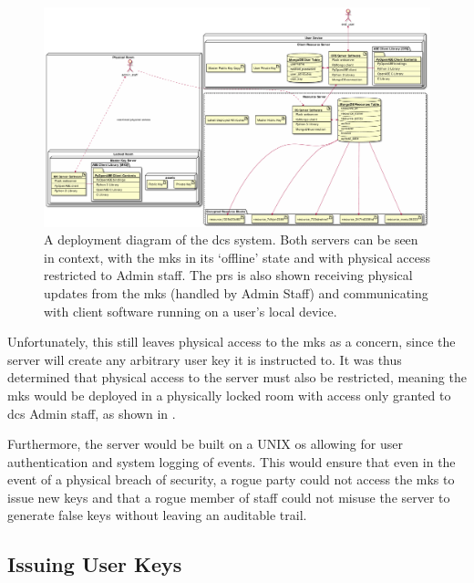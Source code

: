 \begin{figure}[htp]
    \includegraphics[width=\linewidth,keepaspectratio]{images/infrastructure/deployment.pdf}

    \caption{A deployment diagram of the \acrshort{dcs} \theResServer system. Both servers can be seen in context, with the \acrfull{mks} in its `offline' state and with physical access restricted to Admin staff. The \acrfull{prs} is also shown receiving physical updates from the \acrshort{mks} (handled by Admin Staff) and communicating with client software running on a user's local device.}

    \label{fig:deployment_diagram}
\end{figure}

Unfortunately, this still leaves physical access to the \acrshort{mks} as a concern, since the server will create any arbitrary user key it is instructed to. It was thus determined that physical access to the server must also be restricted, meaning the \acrshort{mks} would be deployed in a physically locked room with access only granted to \acrshort{dcs} Admin staff, as shown in .

Furthermore, the server would be built on a UNIX \acrshort{os} allowing for user authentication and system logging of events. This would ensure that even in the event of a physical breach of security, a rogue party could not access the \acrshort{mks} to issue new keys and that a rogue member of staff could not misuse the server to generate false keys without leaving an auditable trail.

\subsection{Issuing User Keys}
\label{subsec:analysis_deployment_iuk}

